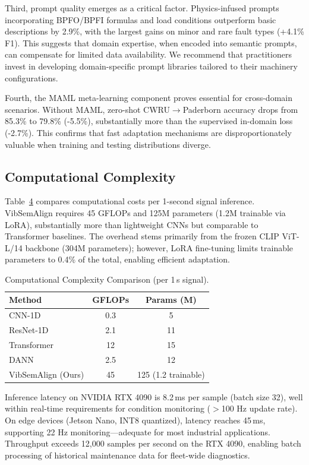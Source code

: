 \begin{table}[htbp]
\begin{table}[htbp]
\begin{table}[htbp]
Third, prompt quality emerges as a critical factor. Physics-infused prompts incorporating BPFO/BPFI formulas and load conditions outperform basic descriptions by 2.9\%, with the largest gains on minor and rare fault types (+4.1\% F1). This suggests that domain expertise, when encoded into semantic prompts, can compensate for limited data availability. We recommend that practitioners invest in developing domain-specific prompt libraries tailored to their machinery configurations.

Fourth, the MAML meta-learning component proves essential for cross-domain scenarios. Without MAML, zero-shot CWRU$\to$Paderborn accuracy drops from 85.3\% to 79.8\% (-5.5\%), substantially more than the supervised in-domain loss (-2.7\%). This confirms that fast adaptation mechanisms are disproportionately valuable when training and testing distributions diverge.

\subsection{Computational Complexity}

Table~\ref{tab:vii} compares computational costs per 1-second signal inference. VibSemAlign requires 45 GFLOPs and 125M parameters (1.2M trainable via LoRA), substantially more than lightweight CNNs but comparable to Transformer baselines. The overhead stems primarily from the frozen CLIP ViT-L/14 backbone (304M parameters); however, LoRA fine-tuning limits trainable parameters to 0.4\% of the total, enabling efficient adaptation.

\begin{table}[htbp]
\centering
\caption{Computational Complexity Comparison (per 1\,s signal).}
\label{tab:vii}
\begin{tabular}{@{}lcc@{}}
\toprule
Method & GFLOPs & Params (M) \\
\midrule
CNN-1D \cite{wen2019convolutional} & 0.3 & 5 \\
ResNet-1D \cite{he2016deep} & 2.1 & 11 \\
Transformer \cite{vaswani2017attention} & 12 & 15 \\
DANN \cite{ganin2016domain} & 2.5 & 12 \\
\midrule
VibSemAlign (Ours) & 45 & 125 (1.2 trainable) \\
\bottomrule
\end{tabular}
\end{table}

Inference latency on NVIDIA RTX 4090 is 8.2\,ms per sample (batch size 32), well within real-time requirements for condition monitoring ($>$100 Hz update rate). On edge devices (Jetson Nano, INT8 quantized), latency reaches 45\,ms, supporting 22 Hz monitoring---adequate for most industrial applications. Throughput exceeds 12,000 samples per second on the RTX 4090, enabling batch processing of historical maintenance data for fleet-wide diagnostics.


\end{table}
\end{table}
\end{table}
